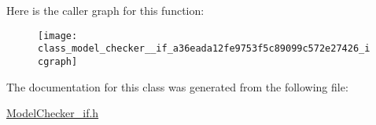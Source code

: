 Here is the caller graph for this function\-:\nopagebreak
\begin{figure}[H]
\begin{center}
\leavevmode
\texttt{[image: class\_model\_checker\_\_if\_a36eada12fe9753f5c89099c572e27426\_icgraph]}
\end{center}
\end{figure}




The documentation for this class was generated from the following file\-:\begin{DoxyCompactItemize}
\item 
\hyperlink{_model_checker__if_8h}{Model\-Checker\-\_\-if.\-h}\end{DoxyCompactItemize}
